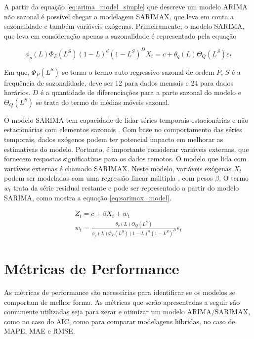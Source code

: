 A partir da equação \ref{eq:arima_model_simple} que descreve um modelo ARIMA não sazonal é possível chegar a modelagem SARIMAX, que leva em conta a sazonalidade e também variáveis exógenas. Primeiramente, o modelo SARIMA, que leva em consideração apenas a sazonalidade é representado pela equação \cite{arunraj2016application, de2018modelo}

\begin{equation}
\label{eq:sarima_model}
    \phi_p(L)\Phi_P(L^S)(1-L)^d(1-L^S)^D X_t = c + \theta_q(L)\Theta_Q(L^S)\varepsilon_t
\end{equation}

Em que, $\Phi_P(L^S)$ se torna o termo auto regressivo sazonal de ordem $P$, $S$ é a frequência de sazonalidade, deve ser 12 para dados mensais e 24 para dados horários. $D$ é a quantidade de diferenciações para a parte sazonal do modelo e $\Theta_Q(L^S)$ se trata do termo de médias móveis sazonal.

O modelo SARIMA tem capacidade de lidar séries temporais estacionárias e não estacionárias com elementos sazonais \cite{arunraj2016application}. Com base no comportamento das séries temporais, dados exógenos podem ter potencial impacto em melhorar as estimativas do modelo. Portanto, é importante considerar variáveis externas, que fornecem respostas significativas para os dados remotos. O modelo que lida com variáveis externas é chamado SARIMAX. Neste modelo, variáveis exógenas $X_t$ podem ser modeladas com uma regressão linear múltipla \cite{arunraj2016application,  elamin2018modeling}, com pesos $\beta$. O termo $w_t$ trata da série residual restante e pode ser representado a partir do modelo SARIMA, como mostra a equação \ref{eq:sarimax_model}.

\begin{equation}
\label{eq:sarimax_model}
    \begin{gathered}
        Z_t = c + \beta X_t +w_t\\
        w_t = \frac{\theta_q(L)\Theta_Q(L^S)}{ \phi_p(L)\Phi_P(L^S)(1-L)^d(1-L^S)^D}\varepsilon_t
    \end{gathered}
\end{equation}

\section{Métricas de Performance}

As métricas de performance são necessárias para identificar se os modelos se comportam de melhor forma. As métricas que serão apresentadas a seguir são comumente utilizadas seja para zerar e otimizar um modelo ARIMA/SARIMAX, como no caso do AIC, como para comparar modelagens híbridas, no caso de MAPE, MAE e RMSE.

